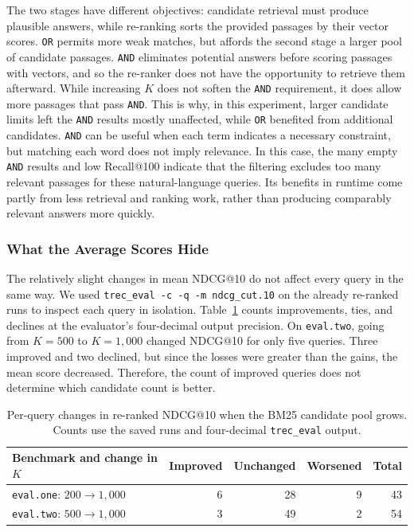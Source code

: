 \documentclass[11pt]{article}
\begin{document}
The two stages have different objectives: candidate retrieval must produce plausible answers, while re-ranking sorts the provided passages by their vector scores. \texttt{OR} permits more weak matches, but affords the second stage a larger pool of candidate passages. \texttt{AND} eliminates potential answers before scoring passages with vectors, and so the re-ranker does not have the opportunity to retrieve them afterward. While increasing $K$ does not soften the \texttt{AND} requirement, it does allow more passages that pass \texttt{AND}. This is why, in this experiment, larger candidate limits left the \texttt{AND} results mostly unaffected, while \texttt{OR} benefited from additional candidates. \texttt{AND} can be useful when each term indicates a necessary constraint, but matching each word does not imply relevance. In this case, the many empty \texttt{AND} results and low Recall@100 indicate that the filtering excludes too many relevant passages for these natural-language queries. Its benefits in runtime come partly from less retrieval and ranking work, rather than producing comparably relevant answers more quickly.

\subsubsection{What the Average Scores Hide}
The relatively slight changes in mean NDCG@10 do not affect every query in the same way. We used \texttt{trec\_eval -c -q -m ndcg\_cut.10} on the already re-ranked runs to inspect each query in isolation. Table~\ref{tab:query_changes} counts improvements, ties, and declines at the evaluator's four-decimal output precision. On \texttt{eval.two}, going from $K=500$ to $K=1{,}000$ changed NDCG@10 for only five queries. Three improved and two declined, but since the losses were greater than the gains, the mean score decreased. Therefore, the count of improved queries does not determine which candidate count is better.

\begin{table}[H]
\centering
\begin{tabular}{lrrrr}
\toprule
\textbf{Benchmark and change in $K$} & \textbf{Improved} & \textbf{Unchanged} & \textbf{Worsened} & \textbf{Total} \\
\midrule
\texttt{eval.one}: $200\to1{,}000$ & 6 & 28 & 9 & 43 \\
\texttt{eval.two}: $500\to1{,}000$ & 3 & 49 & 2 & 54 \\
\bottomrule
\end{tabular}
\caption{Per-query changes in re-ranked NDCG@10 when the BM25 candidate pool grows. Counts use the saved runs and four-decimal \texttt{trec\_eval} output.}
\label{tab:query_changes}
\end{table}
\end{document}
